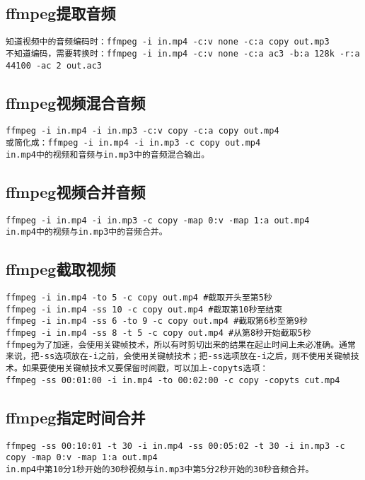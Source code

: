 \documentclass[a4paper,fontset=fandol,zihao=-4,linespread=1.2,oneside]{ctexbook}
\begin{document}
\subsection{ffmpeg提取音频}
\begin{lstlisting}
知道视频中的音频编码时：ffmpeg -i in.mp4 -c:v none -c:a copy out.mp3
不知道编码，需要转换时：ffmpeg -i in.mp4 -c:v none -c:a ac3 -b:a 128k -r:a 44100 -ac 2 out.ac3
\end{lstlisting}

\subsection{ffmpeg视频混合音频}
\begin{lstlisting}
ffmpeg -i in.mp4 -i in.mp3 -c:v copy -c:a copy out.mp4
或简化成：ffmpeg -i in.mp4 -i in.mp3 -c copy out.mp4
in.mp4中的视频和音频与in.mp3中的音频混合输出。
\end{lstlisting}

\subsection{ffmpeg视频合并音频}
\begin{lstlisting}
ffmpeg -i in.mp4 -i in.mp3 -c copy -map 0:v -map 1:a out.mp4
in.mp4中的视频与in.mp3中的音频合并。
\end{lstlisting}

\subsection{ffmpeg截取视频}
\begin{lstlisting}
ffmpeg -i in.mp4 -to 5 -c copy out.mp4 #截取开头至第5秒
ffmpeg -i in.mp4 -ss 10 -c copy out.mp4 #截取第10秒至结束
ffmpeg -i in.mp4 -ss 6 -to 9 -c copy out.mp4 #截取第6秒至第9秒
ffmpeg -i in.mp4 -ss 8 -t 5 -c copy out.mp4 #从第8秒开始截取5秒
ffmpeg为了加速，会使用关键帧技术，所以有时剪切出来的结果在起止时间上未必准确。通常来说，把-ss选项放在-i之前，会使用关键帧技术；把-ss选项放在-i之后，则不使用关键帧技术。如果要使用关键帧技术又要保留时间戳，可以加上-copyts选项：
ffmpeg -ss 00:01:00 -i in.mp4 -to 00:02:00 -c copy -copyts cut.mp4
\end{lstlisting}

\subsection{ffmpeg指定时间合并}
\begin{lstlisting}
ffmpeg -ss 00:10:01 -t 30 -i in.mp4 -ss 00:05:02 -t 30 -i in.mp3 -c copy -map 0:v -map 1:a out.mp4
in.mp4中第10分1秒开始的30秒视频与in.mp3中第5分2秒开始的30秒音频合并。
\end{lstlisting}
\end{document}
